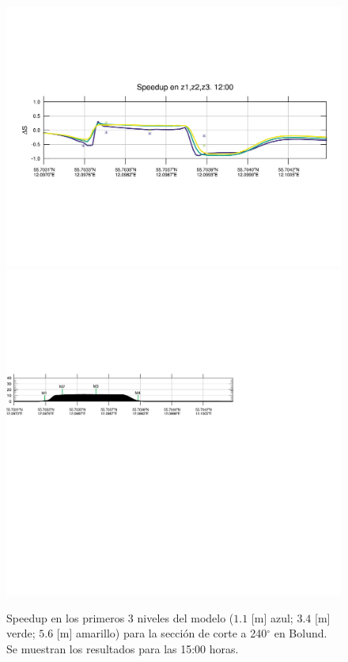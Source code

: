 \begin{figure}[H]
	\centering
	\includegraphics[width=0.9\linewidth,trim={12mm 84mm 10mm 74mm},page=37,clip]{Imagenes/06/bol/speedup}\\%
	\includegraphics[width=0.9\linewidth,trim={-11mm 205mm 115mm 112mm},clip]{Imagenes/06/bol/cross_height}\\%
	\caption{Speedup en los primeros 3 niveles del modelo ($1.1$ [m] azul; $3.4$ [m] verde; $5.6$ [m] amarillo) para la sección de corte a 240$^\circ$ en Bolund. Se muestran los resultados para las 15:00 horas.}
	\label{fig:06_bol_speedup}
\end{figure}

